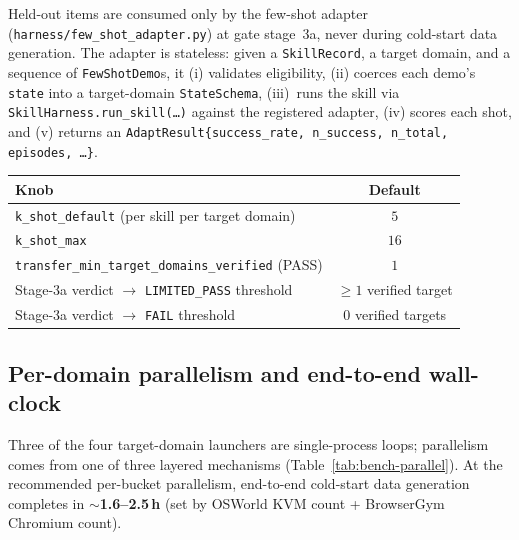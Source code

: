 Held-out items are consumed only by the few-shot adapter
(\texttt{harness/few\_shot\_adapter.py}) at gate stage~3a, never during
cold-start data generation. The adapter is stateless: given a
\texttt{SkillRecord}, a target domain, and a sequence of
\texttt{FewShotDemo}s, it (i) validates eligibility, (ii) coerces each
demo's \texttt{state} into a target-domain \texttt{StateSchema},
(iii)~runs the skill via \texttt{SkillHarness.run\_skill(\dots)}
against the registered adapter, (iv) scores each shot, and (v) returns
an \texttt{AdaptResult\{success\_rate, n\_success, n\_total, episodes,
\dots\}}.
\begin{center}
\small
\begin{tabular}{@{}lc@{}}
\toprule
\textbf{Knob} & \textbf{Default} \\
\midrule
\texttt{k\_shot\_default} (per skill per target domain) & $5$  \\
\texttt{k\_shot\_max}                                   & $16$ \\
\texttt{transfer\_min\_target\_domains\_verified} (PASS) & $1$ \\
Stage-3a verdict $\to$ \texttt{LIMITED\_PASS} threshold & $\geq 1$ verified target \\
Stage-3a verdict $\to$ \texttt{FAIL} threshold          & $0$ verified targets \\
\bottomrule
\end{tabular}
\end{center}

\subsection{Per-domain parallelism and end-to-end wall-clock}
\label{app:bench-parallelism}

Three of the four target-domain launchers are single-process loops;
parallelism comes from one of three layered mechanisms
(Table~\ref{tab:bench-parallel}). At the recommended per-bucket
parallelism, end-to-end cold-start data generation completes in
\textbf{$\sim$1.6--2.5\,h} (set by OSWorld KVM count + BrowserGym
Chromium count).


